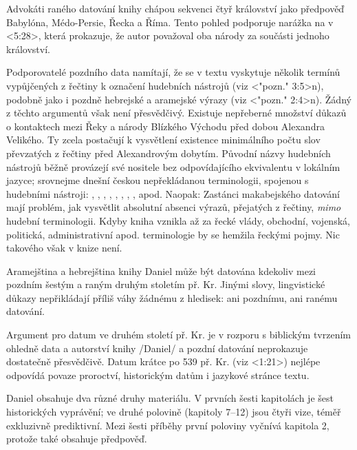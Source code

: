Advokáti raného datování knihy chápou sekvenci čtyř království jako předpověď Babylóna, Médo-Persie, Řecka a Říma. 
Tento pohled podporuje narážka na  v <5:28>, která prokazuje, že autor považoval oba národy za součásti jednoho království.

Podporovatelé pozdního data namítají, že se v textu vyskytuje několik termínů vypůjčených z řečtiny k označení hudebních nástrojů (viz <"pozn." 3:5>n), podobně jako i  pozdně hebrejské a aramejské výrazy (viz <"pozn." 2:4>n).
Žádný z těchto argumentů však není přesvědčivý.
Existuje nepřeberné množství důkazů o kontaktech mezi Řeky a národy Blízkého Východu před dobou Alexandra Velikého. Ty zcela postačují k vysvětlení existence minimálního počtu slov převzatých z řečtiny před Alexandrovým dobytím. 
Původní názvy hudebních nástrojů běžně provázejí své nositele bez odpovídajícího ekvivalentu v lokálním jazyce; srovnejme dnešní českou nepřekládanou terminologii, spojenou s hudebními nástroji:  , , , , , , , ,  apod.
Naopak: Zastánci makabejského datování mají problém, jak vysvětlit absolutní absenci výrazů, přejatých z řečtiny, {\it mimo\/} hudební terminologii. Kdyby kniha vznikla až za řecké vlády, obchodní, vojenská, politická, administrativní apod. terminologie  by se hemžila řeckými pojmy. Nic takového však v knize není.

Aramejština a hebrejština knihy Daniel může být datována kdekoliv mezi pozdním šestým a raným druhým stoletím př. Kr. Jinými slovy, lingvistické důkazy nepřikládají příliš váhy žádnému z hledisek: ani pozdnímu, ani ranému datování.

Argument pro datum ve druhém století př. Kr. je v rozporu s biblickým tvrzením ohledně data a autorství knihy \x/Daniel/ a pozdní datování neprokazuje dostatečně přesvědčivě.   Datum krátce po 539 př. Kr. (viz <1:21>) nejlépe odpovídá povaze proroctví, historickým datům i jazykové stránce textu.


 
 Daniel obsahuje dva různé druhy materiálu.
 V prvních šesti kapitolách je šest historických vyprávění; ve druhé polovině (kapitoly 7--12) jsou čtyři vize, téměř exkluzivně prediktivní. Mezi šesti příběhy první poloviny vyčnívá kapitola 2, protože také obsahuje předpověď. 

